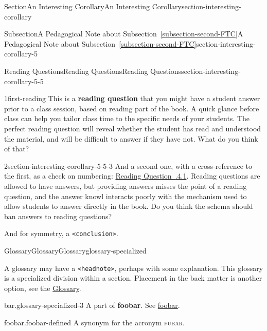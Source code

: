 \documentclass[twoside,10pt,]{article}
\newcommand{\xreffont}{\relax}
\newcommand{\mono}[1]{\texttt{#1}}
\newcommand{\acronym}[1]{\textsc{\MakeLowercase{#1}}}
\newcommand{\terminology}[1]{\textbf{#1}}
\numberwithin{equation}{section}
\begin{document}
\begin{sectionptx}{Section}{An Interesting Corollary}{}{An Interesting Corollary}{}{}{section-interesting-corollary}
\begin{subsectionptx}{Subsection}{A Pedagogical Note about Subsection~{\xreffont\ref*{subsection-second-FTC}}}{}{A Pedagogical Note about Subsection~{\xreffont\ref*{subsection-second-FTC}}}{}{}{section-interesting-corollary-5}
\begin{reading-questions-subsubsection}{Reading Questions}{Reading Questions}{}{Reading Questions}{}{}{section-interesting-corollary-5-5}
\begin{divisionexercise}{1}{}{}{first-reading}
This is a \terminology{reading question} that you might have a student answer prior to a class session, based on reading part of the book. A quick glance before class can help you tailor class time to the specific needs of your students. The perfect reading question will reveal whether the student has read and understood the material, and will be difficult to answer if they have not. What do you think of that?%
\end{divisionexercise}%
\begin{divisionexercise}{2}{}{}{section-interesting-corollary-5-5-3}%
And a second one, with a cross-reference to the first, as a check on numbering: \hyperlink{first-reading}{Reading Question~{\xreffont 4.2.4.1}}. Reading questions are allowed to have answers, but providing answers misses the point of a reading question, and the answer knowl interacts poorly with the mechanism used to allow students to answer directly in the book. Do you think the schema should ban answers to reading questions?%
\end{divisionexercise}%
\begin{conclusion}{}%
And for symmetry, a \mono{<conclusion>}.%
\end{conclusion}%
\end{reading-questions-subsubsection}
%
%
\typeout{************************************************}
\typeout{************************************************}
%
\begin{glossary-subsubsection}{Glossary}{Glossary}{}{Glossary}{}{}{glossary-specialized}
%
\begin{introduction}{}%
A glossary may have a \mono{<headnote>}, perhaps with some explanation.  This glossary is a specialized division within a section.  Placement in the back matter is another option, see the \hyperlink{glossary-backmatter}{Glossary}.%
\end{introduction}%
\begin{glossaryitem}{bar.}{glossary-specialized-3}
A part of \terminology{foobar}.  See \hyperref[foobar-defined]{foobar}.%
\end{glossaryitem}
\begin{glossaryitem}{foobar.}{foobar-defined}
A synonym for the acronym \acronym{FUBAR}.%
\end{glossaryitem}
\end{glossary-subsubsection}
%
%
\typeout{************************************************}

\end{subsectionptx}
\end{sectionptx}
\end{document}
